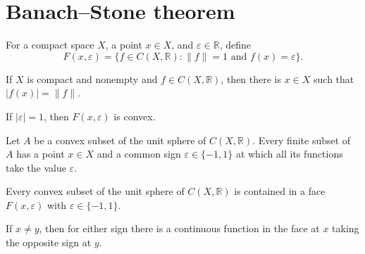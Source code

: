 \section{Banach--Stone theorem}

\begin{definition}
\label{def:banach-stone-face}
\leanok
For a compact space $X$, a point $x\in X$, and $\varepsilon\in\mathbb R$, define
\[
  F(x,\varepsilon)=\{f\in C(X,\mathbb R):\|f\|=1\text{ and }f(x)=\varepsilon\}.
\]
\end{definition}

\begin{lemma}
\label{lem:banach-stone-norm-attained}
\leanok
If $X$ is compact and nonempty and $f\in C(X,\mathbb R)$, then there is $x\in X$ such that
$|f(x)|=\|f\|$.
\end{lemma}

\begin{lemma}
\label{lem:banach-stone-face-convex}
\leanok
{}
If $|\varepsilon|=1$, then $F(x,\varepsilon)$ is convex.
\end{lemma}

\begin{lemma}
\label{lem:banach-stone-finite-common-sign}
\leanok
{}
Let $A$ be a convex subset of the unit sphere of $C(X,\mathbb R)$.  Every finite
subset of $A$ has a point $x\in X$ and a common sign $\varepsilon\in\{-1,1\}$ at
which all its functions take the value $\varepsilon$.
\end{lemma}

\begin{lemma}
\label{lem:banach-stone-convex-subset-face}
\leanok
{}
Every convex subset of the unit sphere of $C(X,\mathbb R)$ is contained in a
face $F(x,\varepsilon)$ with $\varepsilon\in\{-1,1\}$.
\end{lemma}

\begin{lemma}
\label{lem:banach-stone-separator}
\leanok
{}
If $x\ne y$, then for either sign there is a continuous function in the face at
$x$ taking the opposite sign at $y$.
\end{lemma}

